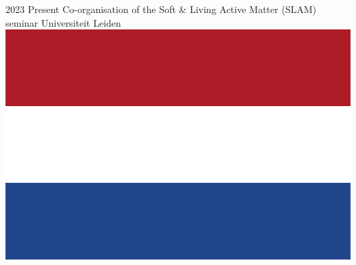\documentclass[a4paper]{cvtemplate_en} %
\begin{document}
\begin{cvbody}

\cvitem
	{2023}
	{Present}
	{Co-organisation of the Soft \& Living Active Matter (SLAM) seminar}
	{Universiteit Leiden \includegraphics[height=0.8\myheight]{nl}\vspace{-5pt}}
	{}{}{}
	{}
	{\vspace{5pt}}

\end{cvbody}
\end{document}
